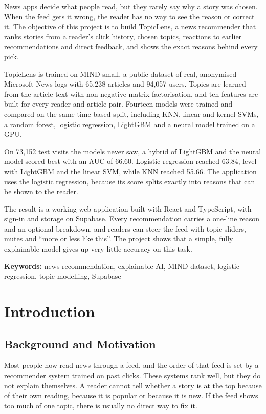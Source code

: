 \documentclass[12pt,a4paper,oneside]{report}
\begin{document}
News apps decide what people read, but they rarely say why a story was chosen. When the feed gets it
wrong, the reader has no way to see the reason or correct it. The objective of this project is to build
TopicLens, a news recommender that ranks stories from a reader's click history, chosen topics, reactions
to earlier recommendations and direct feedback, and shows the exact reasons behind every pick.

TopicLens is trained on MIND-small, a public dataset of real, anonymised Microsoft News logs with 65,238
articles and 94,057 users. Topics are learned from the article text with non-negative matrix
factorisation, and ten features are built for every reader and article pair. Fourteen models were
trained and compared on the same time-based split, including KNN, linear and kernel SVMs, a random
forest, logistic regression, LightGBM and a neural model trained on a GPU.

On 73,152 test visits the models never saw, a hybrid of LightGBM and the neural model scored best with
an AUC of 66.60. Logistic regression reached 63.84, level with LightGBM and the linear SVM, while KNN
reached 55.66. The application uses the logistic regression, because its score splits exactly into
reasons that can be shown to the reader.

The result is a working web application built with React and TypeScript, with sign-in and storage on
Supabase. Every recommendation carries a one-line reason and an optional breakdown, and readers can
steer the feed with topic sliders, mutes and ``more or less like this''. The project shows that a simple,
fully explainable model gives up very little accuracy on this task.

\medskip
\noindent\textbf{Keywords:} news recommendation, explainable AI, MIND dataset, logistic regression,
topic modelling, Supabase

\clearpage
\tableofcontents
\clearpage


\chapter{Introduction}

\section{Background and Motivation}
Most people now read news through a feed, and the order of that feed is set by a recommender system
trained on past clicks. These systems rank well, but they do not explain themselves. A reader cannot tell
whether a story is at the top because of their own reading, because it is popular or because it is new.
If the feed shows too much of one topic, there is usually no direct way to fix it.
\end{document}
